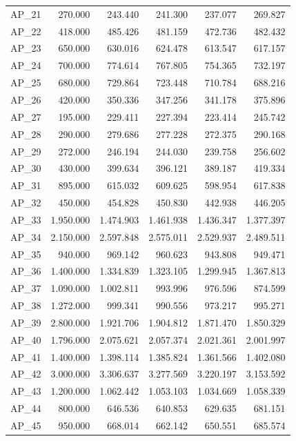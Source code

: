\documentclass[a4paper]{article}
\begin{document}
\begin{table}
\begin{tabular}[t]{lrrrrr}
\addlinespace
AP\_21 & 270.000 & 243.440 & 241.300 & 237.077 & 269.827\\
AP\_22 & 418.000 & 485.426 & 481.159 & 472.736 & 482.432\\
AP\_23 & 650.000 & 630.016 & 624.478 & 613.547 & 617.157\\
AP\_24 & 700.000 & 774.614 & 767.805 & 754.365 & 732.197\\
AP\_25 & 680.000 & 729.864 & 723.448 & 710.784 & 688.216\\
\addlinespace
AP\_26 & 420.000 & 350.336 & 347.256 & 341.178 & 375.896\\
AP\_27 & 195.000 & 229.411 & 227.394 & 223.414 & 245.742\\
AP\_28 & 290.000 & 279.686 & 277.228 & 272.375 & 290.168\\
AP\_29 & 272.000 & 246.194 & 244.030 & 239.758 & 256.602\\
AP\_30 & 430.000 & 399.634 & 396.121 & 389.187 & 419.334\\
\addlinespace
AP\_31 & 895.000 & 615.032 & 609.625 & 598.954 & 617.838\\
AP\_32 & 450.000 & 454.828 & 450.830 & 442.938 & 446.205\\
AP\_33 & 1.950.000 & 1.474.903 & 1.461.938 & 1.436.347 & 1.377.397\\
AP\_34 & 2.150.000 & 2.597.848 & 2.575.011 & 2.529.937 & 2.489.511\\
AP\_35 & 940.000 & 969.142 & 960.623 & 943.808 & 949.471\\
\addlinespace
AP\_36 & 1.400.000 & 1.334.839 & 1.323.105 & 1.299.945 & 1.367.813\\
AP\_37 & 1.090.000 & 1.002.811 & 993.996 & 976.596 & 874.599\\
AP\_38 & 1.272.000 & 999.341 & 990.556 & 973.217 & 995.271\\
AP\_39 & 2.800.000 & 1.921.706 & 1.904.812 & 1.871.470 & 1.850.329\\
AP\_40 & 1.796.000 & 2.075.621 & 2.057.374 & 2.021.361 & 2.001.997\\
\addlinespace
AP\_41 & 1.400.000 & 1.398.114 & 1.385.824 & 1.361.566 & 1.402.080\\
AP\_42 & 3.000.000 & 3.306.637 & 3.277.569 & 3.220.197 & 3.153.592\\
AP\_43 & 1.200.000 & 1.062.442 & 1.053.103 & 1.034.669 & 1.058.339\\
AP\_44 & 800.000 & 646.536 & 640.853 & 629.635 & 681.151\\
AP\_45 & 950.000 & 668.014 & 662.142 & 650.551 & 685.574\\

\end{tabular}
\end{table}
\end{document}
